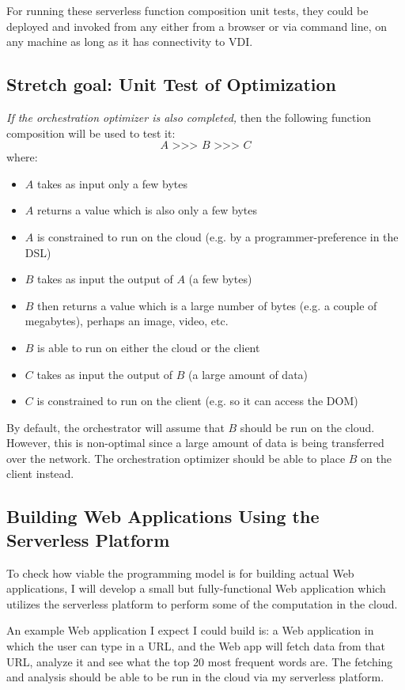 \documentclass[12pt]{article}
\begin{document}
For running these serverless function composition
unit tests, they could be deployed and invoked from any
either from a browser or via command line, on any machine
as long as it has connectivity to VDI.

\subsection{Stretch goal: Unit Test of Optimization}

\emph{If the orchestration optimizer is also completed,}
then the following function composition will be used to test it:
\[
  A \texttt{ >>> } B \texttt{ >>> } C
\]
where:
\begin{itemize}
  \item $A$ takes as input only a few bytes
  \item $A$ returns a value which is also only a few bytes
  \item $A$ is constrained to run on the cloud (e.g. by a programmer-preference in the DSL)
  \item $B$ takes as input the output of $A$ (a few bytes)
  \item $B$ then returns a value which is a large number of bytes (e.g. a couple of megabytes), perhaps an image, video, etc.
  \item $B$ is able to run on either the cloud or the client
  \item $C$ takes as input the output of $B$ (a large amount of data)
  \item $C$ is constrained to run on the client (e.g. so it can access the DOM)
\end{itemize}
By default, the orchestrator will assume that $B$ should be run on the cloud.
However, this is non-optimal since a large amount of data is being transferred over the network.
The orchestration optimizer should be able to place $B$ on the client instead.

\subsection{Building Web Applications Using the Serverless Platform}

To check how viable the programming model is for building
actual Web applications, I will develop a small but
fully-functional Web application which utilizes the serverless
platform to perform some of the computation in the cloud.

An example Web application I expect I could build is:
a Web application in which the user can type in a URL,
and the Web app will fetch data from that URL, analyze it
and see what the top 20 most frequent words are. The fetching
and analysis should be able to be run in the cloud via
my serverless platform.
\end{document}
